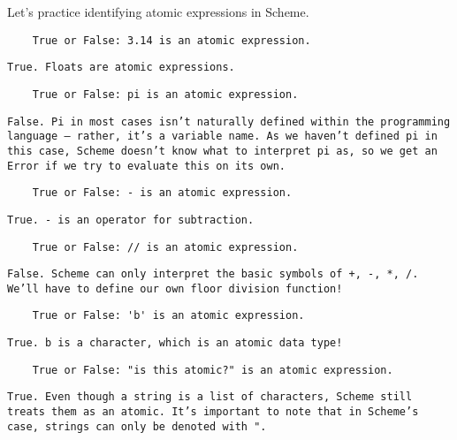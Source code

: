\begin{blocksection}
Let's practice identifying atomic expressions in Scheme.

\begin{lstlisting}
    True or False: 3.14 is an atomic expression.
\end{lstlisting}
\begin{solution}[0.25in]
\texttt{True. Floats are atomic expressions.}
\end{solution}

\begin{lstlisting}
    True or False: pi is an atomic expression.
\end{lstlisting}
\begin{solution}[0.25in]
    \texttt{False. Pi in most cases isn't naturally defined within the programming language -- rather, it's a variable name. As we haven't defined pi in this case, Scheme doesn't know what to interpret pi as, so we get an Error if we try to evaluate this on its own.}
\end{solution}

\begin{lstlisting}
    True or False: - is an atomic expression.
\end{lstlisting}
\begin{solution}[0.25in]
    \texttt{True. - is an operator for subtraction.}
\end{solution}

\begin{lstlisting}
    True or False: // is an atomic expression.
\end{lstlisting}
\begin{solution}[0.25in]
    \texttt{False. Scheme can only interpret the basic symbols of +, -, *, /. We'll have to define our own floor division function!}
\end{solution}

\begin{lstlisting}
    True or False: 'b' is an atomic expression.
\end{lstlisting}
\begin{solution}[0.25in]
    \texttt{True. b is a character, which is an atomic data type!}
\end{solution}

\begin{lstlisting}
    True or False: "is this atomic?" is an atomic expression.
\end{lstlisting}
\begin{solution}[0.25in]
    \texttt{True. Even though a string is a list of characters, Scheme still treats them as an atomic. It's important to note that in Scheme's case, strings can only be denoted with ".}
\end{solution}
\end{blocksection}